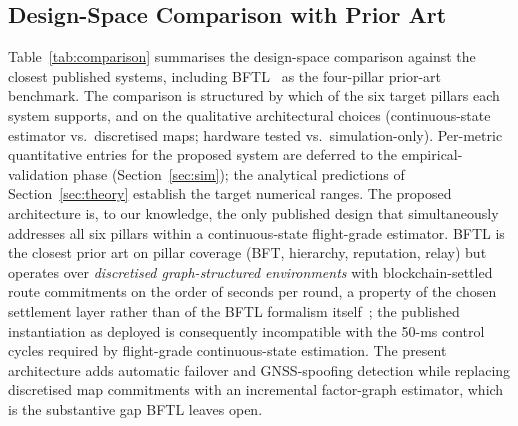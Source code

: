 \documentclass[conference,10pt]{IEEEtran}
\begin{document}
\subsection{Design-Space Comparison with Prior Art}
\label{sec:comparison}

Table~\ref{tab:comparison} summarises the design-space comparison against the closest published systems, including BFTL~\cite{castelloferrer2022bftl} as the four-pillar prior-art benchmark. The comparison is structured by which of the six target pillars each system supports, and on the qualitative architectural choices (continuous-state estimator vs.\ discretised maps; hardware tested vs.\ simulation-only). Per-metric quantitative entries for the proposed system are deferred to the empirical-validation phase (Section~\ref{sec:sim}); the analytical predictions of Section~\ref{sec:theory} establish the target numerical ranges. The proposed architecture is, to our knowledge, the only published design that simultaneously addresses all six pillars within a continuous-state flight-grade estimator. BFTL is the closest prior art on pillar coverage (BFT, hierarchy, reputation, relay) but operates over \emph{discretised graph-structured environments} with blockchain-settled route commitments on the order of seconds per round, a property of the chosen settlement layer rather than of the BFTL formalism itself~\cite{strobel2020blockchain}; the published instantiation as deployed is consequently incompatible with the 50-ms control cycles required by flight-grade continuous-state estimation. The present architecture adds automatic failover and GNSS-spoofing detection while replacing discretised map commitments with an incremental factor-graph estimator, which is the substantive gap BFTL leaves open.
\end{document}
